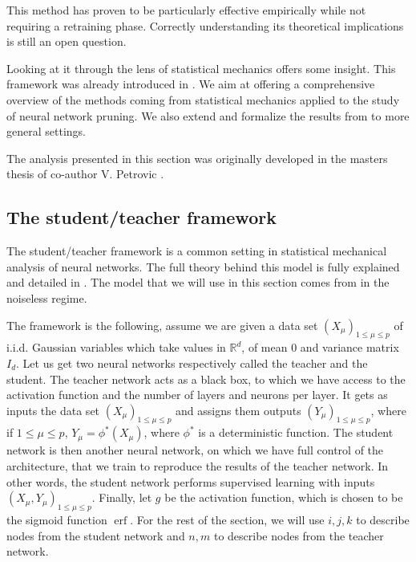 This method has proven to be particularly effective empirically while not requiring a retraining phase. Correctly understanding its theoretical implications is still an open question.

Looking at it through the lens of statistical mechanics offers some insight. This framework was already introduced in \cite{acharyya_statistical_2021}.
We aim at offering a comprehensive overview of the methods coming from statistical mechanics applied to the study of neural network pruning. We also extend and formalize the results from \cite{acharyya_statistical_2021} to more general settings. 

The analysis presented in this section was originally developed in the masters thesis \cite{petrovic2023pruning} of co-author V. Petrovic .


\subsection{The student/teacher framework}


The student/teacher framework is a common setting in statistical mechanical analysis of neural networks. The full theory behind this model is fully explained and detailed in \cite{engel_statistical_2001}. The model that we will use in this section comes from \cite{goldt_dynamics_2020} in the noiseless regime.

The framework is the following, assume we are given a data set $(X_\mu)_{1 \leq \mu \leq p}$ of i.i.d. Gaussian variables which take values in $\mathbb{R}^d$, of mean $0$ and variance matrix $I_d$. Let us get two neural networks respectively called the teacher and the student. The teacher network acts as a black box, to which we have access to the activation function and the number of layers and neurons per layer. It gets as inputs the data set $(X_\mu)_{1 \leq \mu \leq p}$ and assigns them outputs $(Y_\mu)_{1 \leq \mu \leq p}$, where if $1 \leq \mu \leq p$, $Y_\mu = \phi^*(X_\mu)$, where $\phi^*$ is a deterministic function. The student network is then another neural network, on which we have full control of the architecture, that we train to reproduce the results of the teacher network. In other words, the student network performs supervised learning with inputs $(X_\mu, Y_\mu)_{1 \leq \mu \leq p}$. Finally, let $g$ be the activation function, which is chosen to be the sigmoid function $\operatorname{erf}$. 
For the rest of the section, we will use $i,j,k$ to describe nodes from the student network and $n,m$ to describe nodes from the teacher network.

